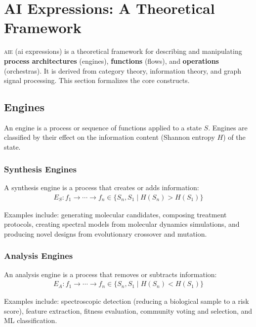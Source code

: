 \documentclass[11pt,letterpaper]{article}
\newcommand{\keyword}[1]{\textbf{\textcolor{accentpurple}{#1}}}
\newcommand{\aie}{\textsc{aie}}
\begin{document}
\section{AI Expressions: A Theoretical Framework}
\label{sec:aie}

\aie{} (ai expressions) is a theoretical framework for describing and manipulating \keyword{process architectures} (engines), \keyword{functions} (flows), and \keyword{operations} (orchestras). It is derived from category theory, information theory, and graph signal processing. This section formalizes the core constructs.

\subsection{Engines}

An engine is a process or sequence of functions applied to a state $S$. Engines are classified by their effect on the information content (Shannon entropy $H$) of the state.

\subsubsection{Synthesis Engines}

A synthesis engine is a process that creates or adds information:
\begin{align}
    E_S : f_1 \rightarrow \cdots \rightarrow f_n \in \lbrace S_n, S_1 \mid H(S_n) > H(S_1) \rbrace
\end{align}

Examples include: generating molecular candidates, composing treatment protocols, creating spectral models from molecular dynamics simulations, and producing novel designs from evolutionary crossover and mutation.

\subsubsection{Analysis Engines}

An analysis engine is a process that removes or subtracts information:
\begin{align}
    E_A : f_1 \rightarrow \cdots \rightarrow f_n \in \lbrace S_n, S_1 \mid H(S_n) < H(S_1) \rbrace
\end{align}

Examples include: spectroscopic detection (reducing a biological sample to a risk score), feature extraction, fitness evaluation, community voting and selection, and ML classification.
\end{document}
